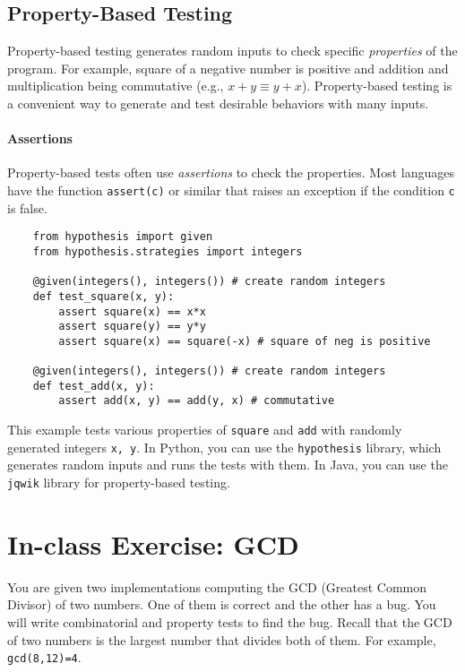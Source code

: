 \documentclass[oneside,11pt,dvipsnames]{book}
\newcommand{\code}[1]{\texttt{#1}}
\begin{document}
\subsection{Property-Based Testing}\label{sec:property-based-testing}
Property-based testing generates random inputs to check specific \emph{properties} of the program. For example, square of a negative number is positive and addition and multiplication being commutative (e.g., $x + y \equiv y + x$). Property-based testing is a convenient way to generate and test desirable behaviors with many inputs.

\paragraph{Assertions} Property-based tests often use \emph{assertions} to check the properties. Most languages have the function \code{assert(c)} or similar that raises an exception if the condition \code{c} is false.


\begin{lstlisting}
    from hypothesis import given
    from hypothesis.strategies import integers

    @given(integers(), integers()) # create random integers
    def test_square(x, y):
        assert square(x) == x*x
        assert square(y) == y*y
        assert square(x) == square(-x) # square of neg is positive

    @given(integers(), integers()) # create random integers
    def test_add(x, y):
        assert add(x, y) == add(y, x) # commutative
\end{lstlisting}

This example tests various properties of \code{square} and \code{add} with randomly generated integers \code{x, y}. In Python, you can use the \code{hypothesis} library, which generates random inputs and runs the tests with them. In Java, you can use the \code{jqwik} library for property-based testing.


\section{In-class Exercise: GCD}
You are given two implementations computing the GCD (Greatest Common Divisor) of two numbers. One of them is correct and the other has a bug.  You will write combinatorial and property tests to find the bug. Recall that the GCD of two numbers is the largest number that divides both of them. For example, \code{gcd(8,12)=4}. 
\end{document}
